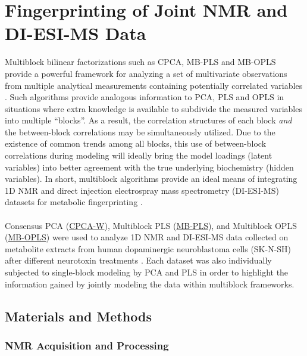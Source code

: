 \section{Fingerprinting of Joint \hnmr{} NMR and DI-ESI-MS Data}

\begin{doublespace}
Multiblock bilinear factorizations such as CPCA, MB-PLS and MB-OPLS provide a
powerful framework for analyzing a set of multivariate observations from
multiple analytical measurements containing potentially correlated variables
\cite{westerhuis:jchemo1997,westerhuis:jchemo1998,smilde:jchemo2003}. Such
algorithms provide analogous information to PCA, PLS and OPLS in situations
where extra knowledge is available to subdivide the measured variables into
multiple ``blocks''. As a result, the correlation structures of each block
\emph{and} the between-block correlations may be simultaneously utilized.
Due to the existence of common trends among all blocks, this use of
between-block correlations during modeling will ideally bring the model
loadings (latent variables) into better agreement with the true underlying
biochemistry (hidden variables). In short, multiblock algorithms provide an
ideal means of integrating 1D \hnmr{} NMR and direct injection electrospray
mass spectrometry (DI-ESI-MS) datasets for metabolic fingerprinting
\cite{xu:abc2013}.
\\\\
Consensus PCA (\hyperlink{subsection.3.5.4}{CPCA-W}),
Multiblock PLS (\hyperlink{subsection.3.5.5}{MB-PLS}), and
Multiblock OPLS (\hyperlink{subsection.3.5.6}{MB-OPLS}) were used to analyze
1D \hnmr{} NMR and DI-ESI-MS data collected on metabolite extracts from
human dopaminergic neuroblastoma cells (SK-N-SH) after different neurotoxin
treatments \cite{marshall:metab2015}. Each dataset was also individually
subjected to single-block modeling by PCA and PLS in order to highlight the
information gained by jointly modeling the data within multiblock frameworks.
\end{doublespace}

\subsection{Materials and Methods}

\subsubsection{NMR Acquisition and Processing}

